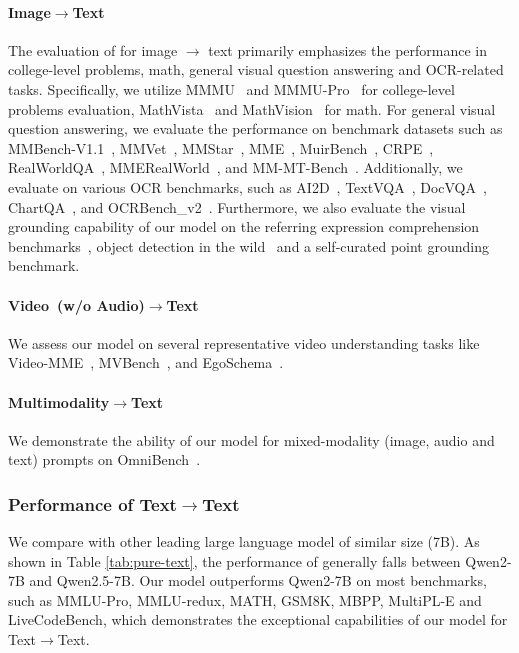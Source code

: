 \paragraph{Image$\to$Text} The evaluation of \method for image $\to$ text primarily emphasizes the performance
in college-level problems, math, general visual question answering and OCR-related tasks. Specifically, we utilize MMMU~\citep{yue2023mmmu} and MMMU-Pro~\citep{mmmupro} for college-level problems evaluation, MathVista~\citep{mathvista} and MathVision~\citep{mathvision} for math. For general visual question answering, we evaluate the performance on benchmark datasets such as MMBench-V1.1~\citep{MMBench}, MMVet~\citep{yu2024mm}, MMStar~\citep{chen2024we}, MME~\citep{fu2023mme}, MuirBench~\citep{wang2024muirbenchcomprehensivebenchmarkrobust}, CRPE~\citep{wang2024allseeingprojectv2general}, RealWorldQA~\citep{X.AI.}, 
MMERealWorld~\citep{mme-realworld}, and MM-MT-Bench~\citep{agrawal2024pixtral12b}. 
Additionally, we evaluate \method on various OCR benchmarks, such as AI2D~\citep{kembhavi2016diagram}, TextVQA~\citep{textvqa}, DocVQA~\citep{docvqa}, ChartQA~\citep{masry2022chartqa}, and OCRBench\_v2~\citep{fu2024ocrbenchv2improvedbenchmark}. Furthermore, we also evaluate the visual grounding capability of our model on the referring expression comprehension benchmarks~\citep{kazemzadeh-etal-2014-referitgame, mao2016generationcomprehensionunambiguousobject}, object detection in the wild~\citep{li2022groundedlanguageimagepretraining} and a self-curated point grounding benchmark. 


\paragraph{Video~(w/o Audio)$\to$Text} We assess our model on several representative video understanding tasks like Video-MME~\citep{fu2024video},
MVBench~\citep{li2024mvbench}, and EgoSchema~\citep{mangalam2023egoschema}.

\paragraph{Multimodality$\to$Text}
We demonstrate the ability of our model for mixed-modality (image, audio and text) prompts on OmniBench~\citep{li2024omnibench}.


\subsubsection{Performance of Text$\to$Text}
We compare \method with other leading large language model of similar size (7B). As shown in Table \ref{tab:pure-text}, the performance of \method generally falls between Qwen2-7B and Qwen2.5-7B. Our model outperforms Qwen2-7B on most benchmarks, such as MMLU-Pro, MMLU-redux, MATH, GSM8K, MBPP, MultiPL-E and LiveCodeBench, which demonstrates the exceptional capabilities of our model for Text$\to$Text.

